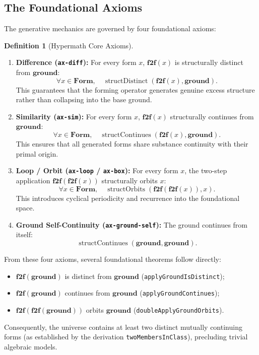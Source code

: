 \documentclass[11pt]{article}
\theoremstyle{definition}
\newtheorem{definition}[theorem]{Definition}
\begin{document}
\subsection{The Foundational Axioms}
The generative mechanics are governed by four foundational axioms:
\begin{definition}[Hypermath Core Axioms]
\hfill
\begin{enumerate}
\item \textbf{Difference (\texttt{ax-diff}):} For every form $x$, $\mathbf{f2f}(x)$ is structurally distinct from $\mathbf{ground}$:
\[
\forall x \in \mathbf{Form},\quad \operatorname{structDistinct}(\mathbf{f2f}(x), \mathbf{ground}).
\]
This guarantees that the forming operator generates genuine excess structure rather than collapsing into the base ground.
\item \textbf{Similarity (\texttt{ax-sim}):} For every form $x$, $\mathbf{f2f}(x)$ structurally continues from $\mathbf{ground}$:
\[
\forall x \in \mathbf{Form},\quad \operatorname{structContinues}(\mathbf{f2f}(x), \mathbf{ground}).
\]
This ensures that all generated forms share substance continuity with their primal origin.
\item \textbf{Loop / Orbit (\texttt{ax-loop} / \texttt{ax-box}):} For every form $x$, the two-step application $\mathbf{f2f}(\mathbf{f2f}(x))$ structurally orbits $x$:
\[
\forall x \in \mathbf{Form},\quad \operatorname{structOrbits}(\mathbf{f2f}(\mathbf{f2f}(x)), x).
\]
This introduces cyclical periodicity and recurrence into the foundational space.
\item \textbf{Ground Self-Continuity (\texttt{ax-ground-self}):} The ground continues from itself:
\[
\operatorname{structContinues}(\mathbf{ground}, \mathbf{ground}).
\]
\end{enumerate}
\end{definition}

From these four axioms, several foundational theorems follow directly:
\begin{itemize}
\item $\mathbf{f2f}(\mathbf{ground})$ is distinct from $\mathbf{ground}$ (\texttt{applyGroundIsDistinct});
\item $\mathbf{f2f}(\mathbf{ground})$ continues from $\mathbf{ground}$ (\texttt{applyGroundContinues});
\item $\mathbf{f2f}(\mathbf{f2f}(\mathbf{ground}))$ orbits $\mathbf{ground}$ (\texttt{doubleApplyGroundOrbits}).
\end{itemize}
Consequently, the universe contains at least two distinct mutually continuing forms (as established by the derivation \texttt{twoMembersInClass}), precluding trivial algebraic models.
\end{document}
